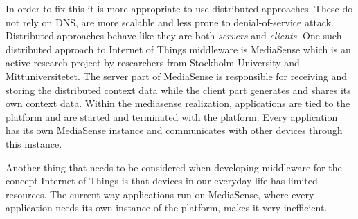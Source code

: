 In order to fix this it is more appropriate to use distributed approaches. These do not rely on DNS, are more scalable and less prone to denial-of-service attack. Distributed approaches behave like they are both \emph{servers} and \emph{clients}. One such distributed approach to Internet of Things middleware is MediaSense \cite{Kanter539187} which is an active research project by researchers from Stockholm University and Mittuniversitetet. The server part of MediaSense is responsible for receiving and storing the distributed context data while the client part generates and shares its own context data. Within the mediasense realization, applications are tied to the platform and are started and terminated with the platform. Every application has its own MediaSense instance and communicates with other devices through this instance.

Another thing that needs to be considered when developing middleware for the concept Internet of Things is that devices in our everyday life has limited resources. The current way applications run on MediaSense, where every application needs its own instance of the platform, makes it very inefficient.